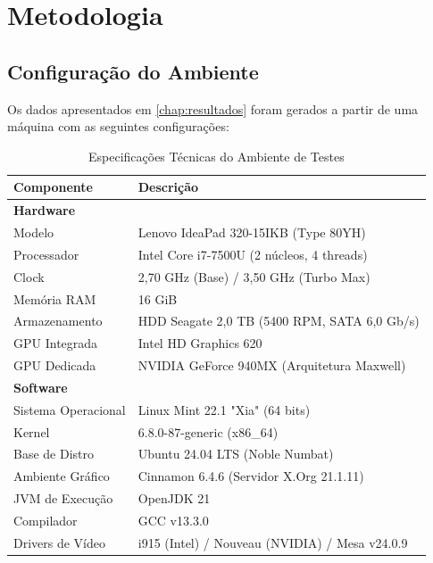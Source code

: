 \chapter{Metodologia}

\section{Configuração do Ambiente}

Os dados apresentados em \ref{chap:resultados} foram gerados a partir de uma
máquina com as seguintes configurações:

\begin{table}[ht]
    \centering
    \caption{Especificações Técnicas do Ambiente de Testes}
    \label{tab:especificacoes_sistema}
    \begin{tabularx}{\textwidth}{l X}
        \toprule
        \textbf{Componente} & \textbf{Descrição} \\
        \midrule
        \textbf{Hardware} & \\
        Modelo & Lenovo IdeaPad 320-15IKB (Type 80YH) \\
        Processador & Intel Core i7-7500U (2 núcleos, 4 threads) \\
        Clock & 2,70 GHz (Base) / 3,50 GHz (Turbo Max) \\
        Memória RAM & 16 GiB \\
        Armazenamento & HDD Seagate 2,0 TB (5400 RPM, SATA 6,0 Gb/s) \\
        GPU Integrada & Intel HD Graphics 620 \\
        GPU Dedicada & NVIDIA GeForce 940MX (Arquitetura Maxwell) \\
        \midrule
        \textbf{Software} & \\
        Sistema Operacional & Linux Mint 22.1 "Xia" (64 bits) \\
        Kernel & 6.8.0-87-generic (x86\_64) \\
        Base de Distro & Ubuntu 24.04 LTS (Noble Numbat) \\
        Ambiente Gráfico & Cinnamon 6.4.6 (Servidor X.Org 21.1.11) \\
        JVM de Execução & OpenJDK 21 \\
        Compilador & GCC v13.3.0 \\
        Drivers de Vídeo & i915 (Intel) / Nouveau (NVIDIA) / Mesa v24.0.9 \\
        \bottomrule
    \end{tabularx}
    \vspace{2pt}
    \small
    \centering
\end{table}

